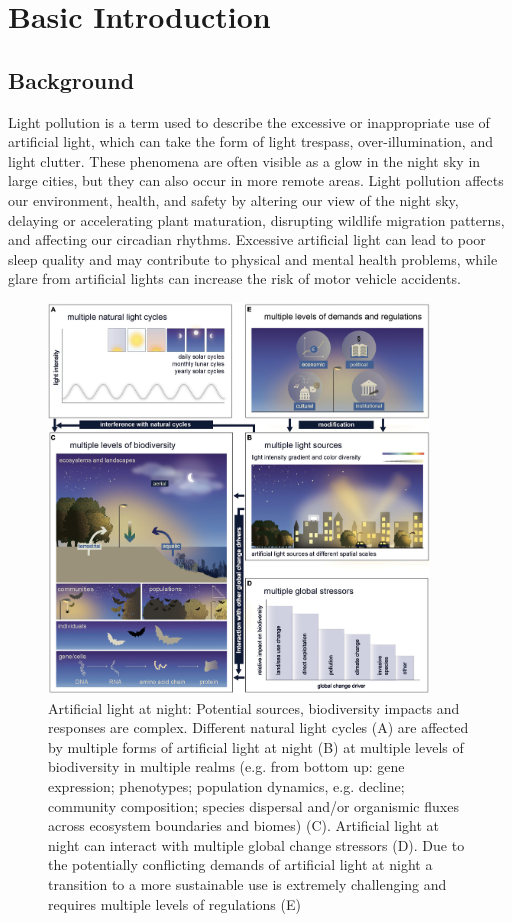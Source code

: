 \MinParskip{}

\section{Basic Introduction}

\subsection{Background}
Light pollution is a term used to describe the excessive or inappropriate use of artificial light, which can take the form of light trespass, over-illumination, and light clutter. These phenomena are often visible as a glow in the night sky in large cities, but they can also occur in more remote areas. Light pollution affects our environment, health, and safety by altering our view of the night sky, delaying or accelerating plant maturation, disrupting wildlife migration patterns, and affecting our circadian rhythms. Excessive artificial light can lead to poor sleep quality and may contribute to physical and mental health problems, while glare from artificial lights can increase the risk of motor vehicle accidents.

\begin{figure}[H]\centering
    \includegraphics[width=0.9\textwidth]{figures/fevo-09-767177-g002.jpg}
    \caption{Artificial light at night: Potential sources, biodiversity impacts and responses are complex. Different natural light cycles (A) are affected by multiple forms of artificial light at night (B) at multiple levels of biodiversity in multiple realms (e.g. from bottom up: gene expression; phenotypes; population dynamics, e.g. decline; community composition; species dispersal and/or organismic fluxes across ecosystem boundaries and biomes) (C). Artificial light at night can interact with multiple global change stressors (D). Due to the potentially conflicting demands of artificial light at night a transition to a more sustainable use is extremely challenging and requires multiple levels of regulations (E) \cite{10.3389/fevo.2021.767177}} \label{fig:figure2}
\end{figure}

